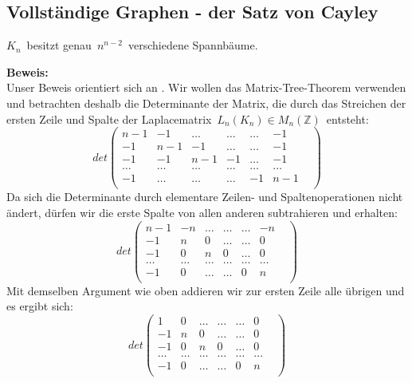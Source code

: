 \subsection{Vollständige Graphen - der Satz von Cayley}
\begin{Tms}
$K_n\,$ besitzt genau $\,n^{n-2}\,$ verschiedene Spannbäume.\\
\end{Tms}
\textbf{Beweis:}\\
Unser Beweis orientiert sich an \cite{Lau_2004}. Wir wollen das Matrix-Tree-Theorem verwenden und betrach\-ten deshalb die Determinante der Matrix, die durch das Streichen der ersten Zeile und Spalte der Laplacematrix $\,L_n(K_n)\in M_n(\mathbb{Z})\,$ entsteht:
\begin{equation*}
det
\begin{pmatrix}
n-1&-1&\ldots&\ldots&\ldots&-1\\
-1&n-1&-1&\ldots&\ldots&-1\\
-1&-1&n-1&-1&\ldots&-1\\
\ldots&\ldots&\ldots&\ldots&\ldots&\ldots&\\
-1&\ldots&\ldots&\ldots&-1&n-1\\
\end{pmatrix}
\end{equation*}
Da sich die Determinante durch elementare Zeilen- und Spaltenoperationen nicht ändert, dürfen wir die erste Spalte von allen anderen subtrahieren und erhalten:
\begin{equation*}det
\begin{pmatrix}
n-1&-n&\ldots&\ldots&\ldots&-n\\
-1&n&0&\ldots&\ldots&0\\
-1&0&n&0&\ldots&0\\
\ldots&\ldots&\ldots&\ldots&\ldots&\ldots&\\
-1&0&\ldots&\ldots&0&n\\
\end{pmatrix}
\end{equation*}
Mit demselben Argument wie oben addieren wir zur ersten Zeile alle übrigen und es ergibt sich:
\begin{equation*}
det
\begin{pmatrix}
1&0&\ldots&\ldots&\ldots&0\\
-1&n&0&\ldots&\ldots&0\\
-1&0&n&0&\ldots&0\\
\ldots&\ldots&\ldots&\ldots&\ldots&\ldots&\\
-1&0&\ldots&\ldots&0&n\\
\end{pmatrix}
\end{equation*}
